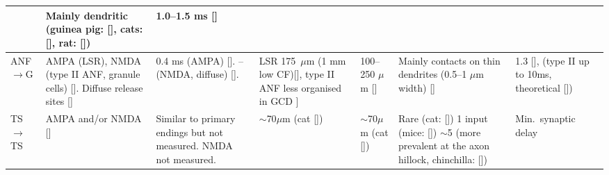 \begin{longtable}{ZYYYYYY}
  & %
Mainly dendritic (guinea pig: [], cats: [], rat: [])
  & %
1.0--1.5 ms []
\\ \midrule
ANF\ensuremath{\rightarrow}G                      
  & %
AMPA (LSR), NMDA (type II ANF, granule cells)
[].
Diffuse release sites []             
  & %
0.4 ms (AMPA)   []. 
-- (NMDA, diffuse) [].    
  & %
LSR 175~$\mu$m (1 mm low CF)[], type II ANF less organised in GCD ]
  & %
100--250 $\mu$m []                     
  & 
Mainly contacts on thin dendrites (0.5--1 $\mu$m width)  []                
  & %
1.3 [], 
(type II up to 10ms, theoretical [])
\\ \midrule
TS\ensuremath{\rightarrow}TS                    
  & %
AMPA and/or NMDA  []        
  & %
Similar to primary endings but not measured.  
NMDA not measured.           
  & 
$\sim$70$\mu$m (cat []) 
  & %
$\sim$70$\mu$m (cat []) 
  & %
Rare (cat: []) 
1 input (mice: [])                     
$\sim$5 (more prevalent at the axon hillock, chinchilla: [])
  & %
Min.\ synaptic delay \\ \midrule

\end{longtable}
